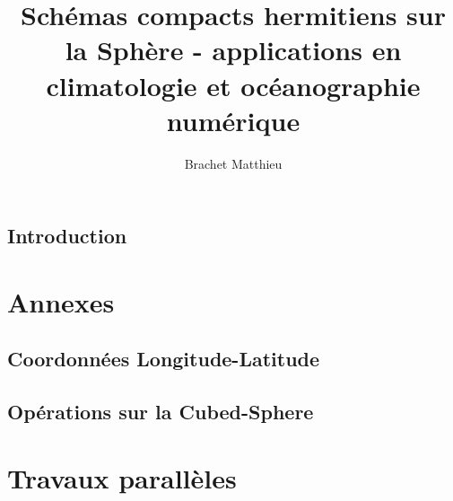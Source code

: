 \documentclass[10pt,a4paper]{book}
\author{Brachet Matthieu}
\title{Schémas compacts hermitiens sur la Sphère - applications en climatologie et océanographie numérique}
\begin{document}
\maketitle
\newpage
\tableofcontents
\listoffigures


\section*{Introduction}
%









\chapter{Annexes}

\section{Coordonnées Longitude-Latitude}


\section{Opérations sur la Cubed-Sphere}


\chapter{Travaux parallèles}





\end{document}
